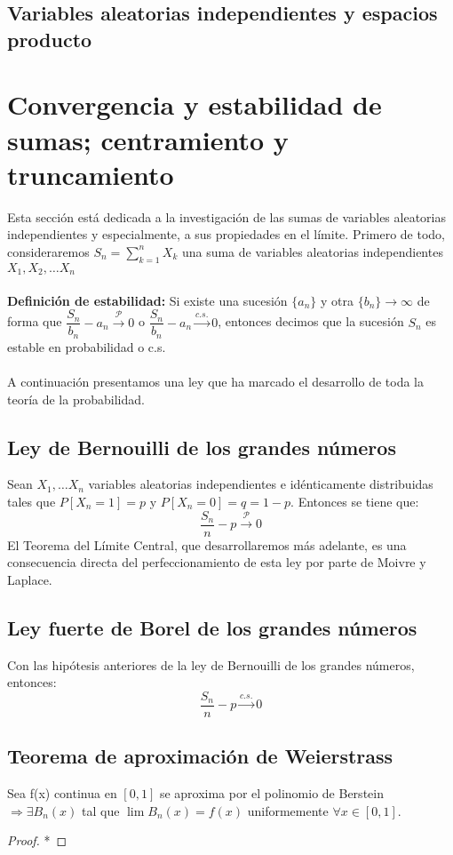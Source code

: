 \subsection{Variables aleatorias independientes y espacios producto}
\section{Convergencia y estabilidad de sumas; centramiento y truncamiento}
Esta sección está dedicada a la investigación de las sumas de variables aleatorias independientes y especialmente, a sus propiedades en el límite. Primero de todo, consideraremos $S_n=\displaystyle\sum_{k=1}^n X_k$ una suma de variables aleatorias independientes $X_1, X_2,\ldots X_n$
\\\\
\textbf{Definición de estabilidad: }Si existe una sucesión $\{a_n\}$ y otra $\{b_n\} \rightarrow \infty$ de forma que $\dfrac{S_n}{b_n}-a_n\stackrel{\mathcal{P}}{\rightarrow}0$ o $\dfrac{S_n}{b_n}-a_n\stackrel{c.s.}{\rightarrow}0$, entonces decimos que la sucesión $S_n$ es estable en probabilidad o c.s. 
\\\\
A continuación presentamos una ley que ha marcado el desarrollo de toda la teoría de la probabilidad.


\subsection{Ley de Bernouilli de los grandes números} %
Sean $X_1,\ldots X_n$ variables aleatorias independientes e idénticamente distribuidas tales que $P[X_n=1]=p$ y $P[X_n=0]=q=1-p$. Entonces se tiene que:
$$\dfrac{S_n}{n}-p \stackrel{\mathcal{P}}{\longrightarrow}0$$
El Teorema del Límite Central, que desarrollaremos más adelante, es una consecuencia directa del perfeccionamiento de esta ley por parte de Moivre y Laplace.

\subsection{Ley fuerte de Borel de los grandes números} %
Con las hipótesis anteriores de la ley de Bernouilli de los grandes números, entonces: $$\dfrac{S_n}{n}-p \stackrel{c.s.}{\longrightarrow}0$$
\subsection{Teorema de aproximación de Weierstrass}
\begin{theorem}
Sea f(x) continua en $[0,1]$ se aproxima por el polinomio de Berstein $\Rightarrow \exists {B_n(x)}$ tal que $\lim B_n (x) = f(x)$ uniformemente $ \forall x \in [0,1]$.
\end{theorem}
\begin{proof}*
\end{proof}
